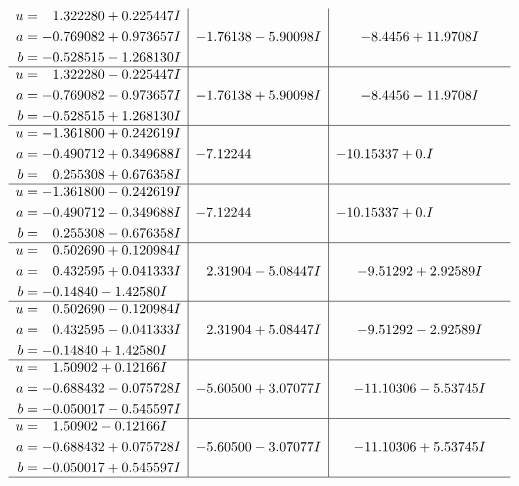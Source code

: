 \documentclass[1p]{elsarticle_modified}
\theoremstyle{definition}
\begin{document}
$$\begin{array}{c|c|c}
\begin{aligned}
u &= \phantom{-}1.322280 + 0.225447 I \\
a &= -0.769082 + 0.973657 I \\
b &= -0.528515 - 1.268130 I\end{aligned}
 & -1.76138 - 5.90098 I & -8.4456 + 11.9708 I \\ \hline\begin{aligned}
u &= \phantom{-}1.322280 - 0.225447 I \\
a &= -0.769082 - 0.973657 I \\
b &= -0.528515 + 1.268130 I\end{aligned}
 & -1.76138 + 5.90098 I & -8.4456 - 11.9708 I \\ \hline\begin{aligned}
u &= -1.361800 + 0.242619 I \\
a &= -0.490712 + 0.349688 I \\
b &= \phantom{-}0.255308 + 0.676358 I\end{aligned}
 & -7.12244\phantom{ +0.000000I} & -10.15337 + 0. I\phantom{ +0.000000I} \\ \hline\begin{aligned}
u &= -1.361800 - 0.242619 I \\
a &= -0.490712 - 0.349688 I \\
b &= \phantom{-}0.255308 - 0.676358 I\end{aligned}
 & -7.12244\phantom{ +0.000000I} & -10.15337 + 0. I\phantom{ +0.000000I} \\ \hline\begin{aligned}
u &= \phantom{-}0.502690 + 0.120984 I \\
a &= \phantom{-}0.432595 + 0.041333 I \\
b &= -0.14840 - 1.42580 I\end{aligned}
 & \phantom{-}2.31904 - 5.08447 I & -9.51292 + 2.92589 I \\ \hline\begin{aligned}
u &= \phantom{-}0.502690 - 0.120984 I \\
a &= \phantom{-}0.432595 - 0.041333 I \\
b &= -0.14840 + 1.42580 I\end{aligned}
 & \phantom{-}2.31904 + 5.08447 I & -9.51292 - 2.92589 I \\ \hline\begin{aligned}
u &= \phantom{-}1.50902 + 0.12166 I \\
a &= -0.688432 - 0.075728 I \\
b &= -0.050017 - 0.545597 I\end{aligned}
 & -5.60500 + 3.07077 I & -11.10306 - 5.53745 I \\ \hline\begin{aligned}
u &= \phantom{-}1.50902 - 0.12166 I \\
a &= -0.688432 + 0.075728 I \\
b &= -0.050017 + 0.545597 I\end{aligned}
 & -5.60500 - 3.07077 I & -11.10306 + 5.53745 I\\
 \hline 
 \end{array}$$\newpage\newpage\renewcommand{\arraystretch}{1}
\end{document}

